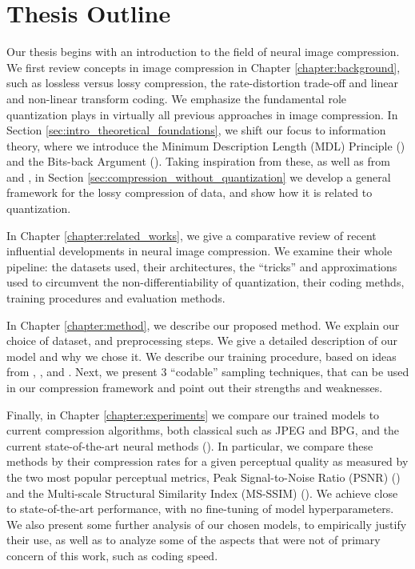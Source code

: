 \section{Thesis Outline}
\par 
Our thesis begins with an introduction to the field of neural image compression.
We first review concepts in image compression in Chapter
\ref{chapter:background}, such as lossless versus lossy
compression, the rate-distortion trade-off and linear and non-linear transform
coding. We emphasize the fundamental role quantization plays in virtually all
previous approaches in image compression. In Section
\ref{sec:intro_theoretical_foundations}, we shift our focus to information
theory, where we introduce the Minimum Description Length (MDL) Principle
(\cite{rissanen1981universal}) and the Bits-back Argument
(\cite{hinton1993keeping}). Taking inspiration from these, as well as from
\cite{harsha2007communication} and \cite{havasi2018minimal}, in Section
\ref{sec:compression_without_quantization}
we develop a general framework for the lossy compression of data, and show how
it is related to quantization.

\par
In Chapter \ref{chapter:related_works}, we give a comparative review of recent
influential developments in neural image compression. We examine their whole
pipeline: the datasets used, their architectures, the ``tricks'' and
approximations used to circumvent the non-differentiability of quantization,
their coding methds, training procedures and evaluation methods.

\par
In Chapter \ref{chapter:method}, we describe our proposed method. We explain our
choice of dataset, and preprocessing steps. We give a detailed description of
our model and why we chose it. We describe our
training procedure, based on ideas from \cite{sonderby2016train},
\cite{higgins2017beta}, \cite{balle2018variational} and \cite{dai2019diagnosing}.
Next, we present 3 ``codable'' sampling techniques, that can be used in our
compression framework and point out their strengths and weaknesses.

\par
Finally, in Chapter \ref{chapter:experiments} we compare our trained models to
current compression algorithms, both classical such as JPEG and BPG, and
the current state-of-the-art neural methods (\cite{balle2018variational}). In
particular, we compare these methods by their compression rates for a given
perceptual quality as measured by the two most popular perceptual metrics, Peak
Signal-to-Noise Ratio (PSNR) (\cite{psnr}) and the Multi-scale Structural
Similarity Index (MS-SSIM) (\cite{msssim}). We achieve close to
state-of-the-art performance, with no fine-tuning of model hyperparameters.
We also present some further analysis of our chosen models, to empirically
justify their use, as well as to analyze some of the aspects that were not of
primary concern of this work, such as coding speed.
\paragraph{}


